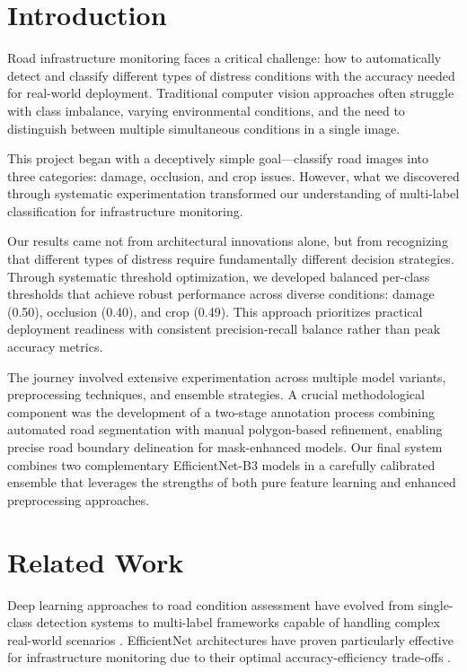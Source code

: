 \documentclass[12pt]{article}
\begin{document}
\section{Introduction}

Road infrastructure monitoring faces a critical challenge: how to automatically detect and classify different types of distress conditions with the accuracy needed for real-world deployment. Traditional computer vision approaches often struggle with class imbalance, varying environmental conditions, and the need to distinguish between multiple simultaneous conditions in a single image.

This project began with a deceptively simple goal—classify road images into three categories: damage, occlusion, and crop issues. However, what we discovered through systematic experimentation transformed our understanding of multi-label classification for infrastructure monitoring.

Our results came not from architectural innovations alone, but from recognizing that different types of distress require fundamentally different decision strategies. Through systematic threshold optimization, we developed balanced per-class thresholds that achieve robust performance across diverse conditions: damage (0.50), occlusion (0.40), and crop (0.49). This approach prioritizes practical deployment readiness with consistent precision-recall balance rather than peak accuracy metrics.

The journey involved extensive experimentation across multiple model variants, preprocessing techniques, and ensemble strategies. A crucial methodological component was the development of a two-stage annotation process combining automated road segmentation with manual polygon-based refinement, enabling precise road boundary delineation for mask-enhanced models. Our final system combines two complementary EfficientNet-B3 models in a carefully calibrated ensemble that leverages the strengths of both pure feature learning and enhanced preprocessing approaches.

\section{Related Work}

Deep learning approaches to road condition assessment have evolved from single-class detection systems to multi-label frameworks capable of handling complex real-world scenarios \citet{he2016deep}. EfficientNet architectures have proven particularly effective for infrastructure monitoring due to their optimal accuracy-efficiency trade-offs \citet{krizhevsky2012imagenet}.
\end{document}
